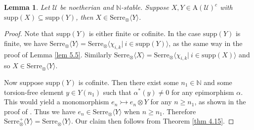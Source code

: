 \documentclass[11pt,a4paper]{amsart}
\numberwithin{equation}{section} \theoremstyle{plain}
\newtheorem{lem}{Lemma}[section]
\begin{document}
\begin{lem}\label{lem 5.6}Let $\mathcal{U}$ be  noetherian and $\mathbb{N}$-stable. Suppose $X,Y\in \mathrm{A}(\mathcal{U})^{c}$ with $\mathrm{supp}(X)\subseteq \mathrm{supp}(Y)$, then $X\in \mathrm{Serre}_{\otimes}\langle Y\rangle$.
\end{lem}
\begin{proof} Note that $\mathrm{supp}(Y)$ is either finite or cofinite. In the case $\mathrm{supp}(Y)$ is  finite, we have $\mathrm{Serre}_{\otimes}\langle Y\rangle=\mathrm{Serre}_{\otimes}\langle \chi_{i,k}|~i\in \mathrm{supp}(Y)\rangle$, as the same way in the proof of Lemma \ref{lem 5.5}. Similarly $\mathrm{Serre}_{\otimes}\langle X\rangle=\mathrm{Serre}_{\otimes}\langle \chi_{i,k}|~i\in \mathrm{supp}(X)\rangle$ and so $X\in \mathrm{Serre}_{\otimes}\langle Y\rangle$.

Now suppose $\mathrm{supp}(Y)$ is cofinite. Then there exist some $n_{1}\in \mathbb{N}$ and some torsion-free element $y\in Y(n_{1})$ such that $\alpha^{*}(y)\neq 0$ for any epimorphism $\alpha$. This would yield a monomorphism $e_{n}\rightarrowtail e_{n}\otimes Y$ for any $n\geq n_{1}$, as shown in the proof of \cite[Lemma 7.10]{BBP+25a}. Thus we have $e_{n}\in \mathrm{Serre}_{\otimes}\langle Y\rangle$ when $n\geq n_{1}$. Therefore $\mathrm{Serre}_{\otimes}^{+}\langle Y\rangle=\mathrm{Serre}_{\otimes}\langle Y\rangle$. Our claim then follows from Theorem \ref{thm 4.15}.
\end{proof}
\end{document}
